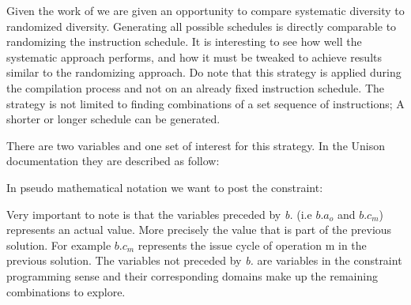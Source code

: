Given the work of \textcite{large-scale-automated} we are given an opportunity to compare
systematic diversity to randomized diversity. Generating all possible schedules is directly
comparable to randomizing the instruction schedule. It is interesting to see how well
the systematic approach performs, and how it must be tweaked to achieve results similar
to the randomizing approach. Do note that this strategy is applied during the compilation
process and not on an already fixed instruction schedule. The strategy is not limited to
finding combinations of a set sequence of instructions; A shorter or longer schedule can
be generated.

There are two variables and one set of interest for this strategy. In the Unison documentation
they are described as follow:

\vspace{0.2cm}

\noindent{}

\vspace{0.2cm}


In pseudo mathematical notation we want to post the constraint:

\vspace{0.2cm}
\noindent{}
\vspace{0.2cm}

Very important to note is that the variables preceded by \textit{b.} (i.e $b.a_o$ and
$b.c_m$) represents an actual value. More precisely the value that is part of the previous
solution. For example $b.c_m$ represents the issue cycle of operation m in the previous
solution. The variables not preceded by \textit{b.} are variables in the constraint
programming sense and their corresponding domains make up the remaining combinations to
explore.

